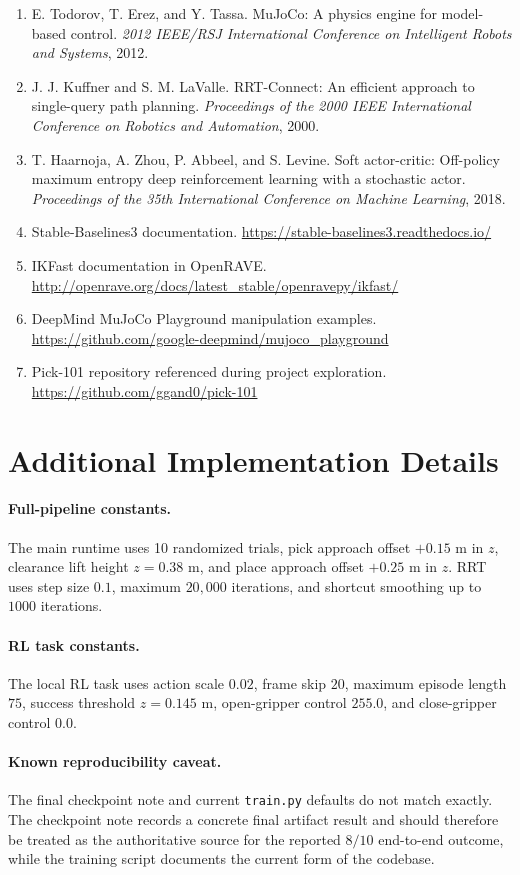 \documentclass[11pt]{article}
\begin{document}
\begin{enumerate}[leftmargin=*]
    \item E. Todorov, T. Erez, and Y. Tassa. MuJoCo: A physics engine for model-based control. \emph{2012 IEEE/RSJ International Conference on Intelligent Robots and Systems}, 2012.
    \item J. J. Kuffner and S. M. LaValle. RRT-Connect: An efficient approach to single-query path planning. \emph{Proceedings of the 2000 IEEE International Conference on Robotics and Automation}, 2000.
    \item T. Haarnoja, A. Zhou, P. Abbeel, and S. Levine. Soft actor-critic: Off-policy maximum entropy deep reinforcement learning with a stochastic actor. \emph{Proceedings of the 35th International Conference on Machine Learning}, 2018.
    \item Stable-Baselines3 documentation. \url{https://stable-baselines3.readthedocs.io/}
    \item IKFast documentation in OpenRAVE. \url{http://openrave.org/docs/latest_stable/openravepy/ikfast/}
    \item DeepMind MuJoCo Playground manipulation examples. \url{https://github.com/google-deepmind/mujoco_playground}
    \item Pick-101 repository referenced during project exploration. \url{https://github.com/ggand0/pick-101}
\end{enumerate}

\appendix

\section{Additional Implementation Details}

\paragraph{Full-pipeline constants.}
The main runtime uses 10 randomized trials, pick approach offset \(+0.15\) m in \(z\), clearance lift height \(z = 0.38\) m, and place approach offset \(+0.25\) m in \(z\). RRT uses step size \(0.1\), maximum \(20{,}000\) iterations, and shortcut smoothing up to \(1000\) iterations.

\paragraph{RL task constants.}
The local RL task uses action scale \(0.02\), frame skip \(20\), maximum episode length \(75\), success threshold \(z = 0.145\) m, open-gripper control \(255.0\), and close-gripper control \(0.0\).

\paragraph{Known reproducibility caveat.}
The final checkpoint note and current \texttt{train.py} defaults do not match exactly. The checkpoint note records a concrete final artifact result and should therefore be treated as the authoritative source for the reported \(8/10\) end-to-end outcome, while the training script documents the current form of the codebase.
\end{document}
